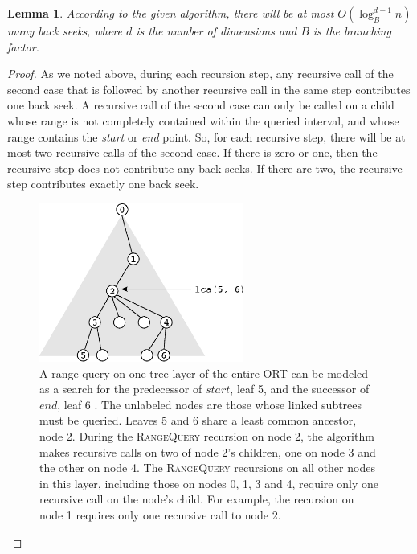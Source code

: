 \documentclass[11pt, oneside]{article}
\newcommand{\ms}{\textit}
\newtheorem*{lemma}{Lemma}
\begin{document}
\begin{lemma}
    According to the given algorithm, there will be at most $O(\log_B^{d-1}n)$
    many back seeks, where $d$ is the number of dimensions and $B$ is the
    branching factor. 
\end{lemma}
\begin{proof}
    As we noted above, during each recursion step, any recursive call of the
    second case that is followed by another recursive call in the same step
    contributes one back seek. A recursive call of the second case can only be
    called on a child whose range is not completely contained within the
    queried interval, and whose range contains the \ms{start} or \ms{end}
    point. So, for each recursive step, there will be at most two recursive
    calls of the second case. If there is zero or one, then the recursive step
    does not contribute any back seeks. If there are two, the recursive step
    contributes exactly one back seek.

    \begin{figure}[h!]
        \centering
        \vspace{0.5in}
        \includegraphics[width=0.6\textwidth]{fig3.eps}
        \caption{
            A range query on one tree layer of the entire ORT can be modeled as
            a search for the predecessor of $start$, leaf 5, and the successor
            of $end$, leaf 6 \cite{lecture}. The unlabeled nodes are those
            whose linked subtrees must be queried. Leaves 5 and 6 share a least
            common ancestor, node 2. During the \textsc{RangeQuery} recursion
            on node 2, the algorithm makes recursive calls on two of node 2's
            children, one on node 3 and the other on node 4. The
            \textsc{RangeQuery} recursions on all other nodes in this layer,
            including those on nodes 0, 1, 3 and 4, require only one recursive
            call on the node's child. For example, the recursion on node 1
            requires only one recursive call to node 2. 
        }
        \vspace{0.5in}
    \end{figure}


\end{proof}
\end{document}
